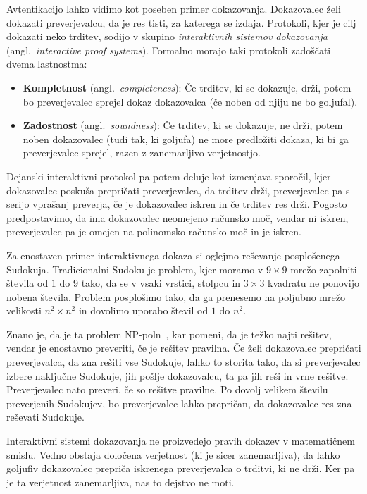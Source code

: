 \documentclass[isrm2, tisk]{fmfdelo}
\begin{document}
Avtentikacijo lahko vidimo kot poseben primer dokazovanja. Dokazovalec želi dokazati preverjevalcu, da
je res tisti, za katerega se izdaja. Protokoli, kjer je cilj dokazati neko trditev, sodijo v skupino
\textit{interaktivnih sistemov dokazovanja} (angl.\ \textit{interactive proof systems}). Formalno
morajo taki protokoli zadoščati dvema lastnostma:
\begin{itemize}
    \item \textbf{Kompletnost} (angl.\ \textit{completeness}): Če trditev, ki se dokazuje,
        drži, potem bo preverjevalec sprejel dokaz dokazovalca (če noben od njiju ne bo goljufal).
    \item \textbf{Zadostnost} (angl.\ \textit{soundness}): Če trditev, ki se dokazuje, ne
        drži, potem noben dokazovalec (tudi tak, ki goljufa) ne more predložiti dokaza, ki bi 
        ga preverjevalec sprejel, razen z zanemarljivo verjetnostjo.
\end{itemize}
Dejanski interaktivni protokol pa potem deluje kot izmenjava sporočil, kjer dokazovalec poskuša
prepričati preverjevalca, da trditev drži, preverjevalec pa s serijo vprašanj preverja, če je
dokazovalec iskren in če trditev res drži. Pogosto predpostavimo, da ima dokazovalec neomejeno
računsko moč, vendar ni iskren, preverjevalec pa je omejen na polinomsko računsko moč in je iskren.

\begin{primer}
    Za enostaven primer interaktivnega dokaza si oglejmo reševanje posplošenega Sudokuja. Tradicionalni
    Sudoku je problem, kjer moramo v $9 \times 9$ mrežo zapolniti števila od $1$ do $9$ tako, da se v vsaki
    vrstici, stolpcu in $3 \times 3$ kvadratu ne ponovijo nobena števila. Problem posplošimo tako, da
    ga prenesemo na poljubno mrežo velikosti $n^2 \times n^2$ in dovolimo uporabo števil od $1$ do $n^2$.

    Znano je, da je ta problem NP-poln~\cite{yato2003sudoku}, kar pomeni, da je težko najti rešitev,
    vendar je enostavno preveriti, če je rešitev pravilna. Če želi dokazovalec prepričati preverjevalca,
    da zna rešiti vse Sudokuje, lahko to storita tako, da si preverjevalec izbere naključne Sudokuje,
    jih pošlje dokazovalcu, ta pa jih reši in vrne rešitve. Preverjevalec nato preveri, če so rešitve pravilne.
    Po dovolj velikem številu preverjenih Sudokujev, bo preverjevalec lahko prepričan, da dokazovalec
    res zna reševati Sudokuje.
\end{primer}

\begin{opomba}
    Interaktivni sistemi dokazovanja ne proizvedejo pravih dokazev v matematičnem smislu. Vedno
    obstaja določena verjetnost (ki je sicer zanemarljiva), da lahko goljufiv dokazovalec prepriča
    iskrenega preverjevalca o trditvi, ki ne drži. Ker pa je ta verjetnost zanemarljiva, nas to
    dejstvo ne moti.
\end{opomba}
\end{document}
